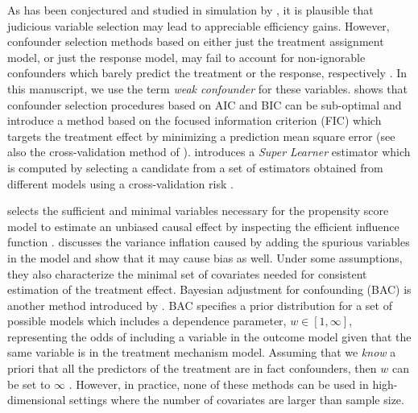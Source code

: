 \documentclass[11pt]{statsoc}
\begin{document}
As has been conjectured and studied in simulation by \cite{brookhart2006variable}, it is plausible that judicious variable selection may lead to appreciable efficiency gains.  However, confounder selection methods based on either just the treatment assignment model, or just the response model, may fail to account for non-ignorable confounders which barely predict the treatment or the response, respectively \citep{crainiceanu2008adjustment}.  In this manuscript, we use the term \textit{weak confounder} for these variables. \cite{vansteelandt2010model} shows that confounder selection procedures based on AIC and BIC can be sub-optimal and introduce a method based on the focused information criterion (FIC) which targets the treatment effect by minimizing a prediction mean square error (see also the cross-validation method of \cite{brookhart2006semiparametric}). \cite{van2007super} introduces a \textit{Super Learner} estimator which is computed by selecting a candidate from a set of estimators obtained from different models using a cross-validation risk \citep{van2004cross, sinisi2007super}. 

\cite{van2010collaborative}  selects the sufficient and minimal variables necessary for the propensity score model to estimate an unbiased causal effect by inspecting the efficient influence function \citep{porter2011relative}.  \cite{de2011covariate} discusses the variance inflation caused by adding the spurious variables in the model and show that it may cause bias as well. Under some assumptions, they also characterize the minimal set of covariates needed for consistent estimation of the treatment effect. Bayesian adjustment for confounding (BAC) is another method introduced by \cite{wang2012bayesian}. BAC specifies a prior distribution for a set of  possible models which includes a dependence parameter, $w\in [1,\infty]$, representing the odds of including a variable in the outcome model given that the same variable is in the treatment mechanism model.  Assuming that we {\it know} a priori that all the predictors of the treatment are in fact confounders, then $w$ can be set to $\infty$ \citep{crainiceanu2008adjustment, zigler2013model}. However, in practice,  none of these methods can be used in high-dimensional settings where the number of covariates are larger than sample size.
\end{document}
